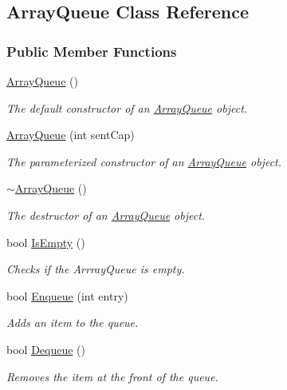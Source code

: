 \hypertarget{class_array_queue}{}\subsection{Array\+Queue Class Reference}
\label{class_array_queue}
\subsubsection*{Public Member Functions}
\begin{DoxyCompactItemize}
\item 
\hyperlink{class_array_queue_a737e3e27c10131c49cc41cdc9a6b9bb0}{Array\+Queue} ()
\begin{DoxyCompactList}\small\item\em The default constructor of an \hyperlink{class_array_queue}{Array\+Queue} object. \end{DoxyCompactList}\item 
\hyperlink{class_array_queue_a0b445b5bcbe7d925df4dcd4dd2e601a1}{Array\+Queue} (int sent\+Cap)
\begin{DoxyCompactList}\small\item\em The parameterized constructor of an \hyperlink{class_array_queue}{Array\+Queue} object. \end{DoxyCompactList}\item 
\hyperlink{class_array_queue_ae0b410b7d7b2dbe849be7b93844955d7}{$\sim$\+Array\+Queue} ()
\begin{DoxyCompactList}\small\item\em The destructor of an \hyperlink{class_array_queue}{Array\+Queue} object. \end{DoxyCompactList}\item 
bool \hyperlink{class_array_queue_a197c7e0da0cf668a1ad792ae456665f7}{Is\+Empty} ()
\begin{DoxyCompactList}\small\item\em Checks if the Arrray\+Queue is empty. \end{DoxyCompactList}\item 
bool \hyperlink{class_array_queue_a28f6022dfecd22d9f709d2ad3c63ef92}{Enqueue} (int entry)
\begin{DoxyCompactList}\small\item\em Adds an item to the queue. \end{DoxyCompactList}\item 
bool \hyperlink{class_array_queue_ab3ad69e6c095b0e2fcc0f805088acf7a}{Dequeue} ()
\begin{DoxyCompactList}\small\item\em Removes the item at the front of the queue. \end{DoxyCompactList}\item 

\end{DoxyCompactItemize}
